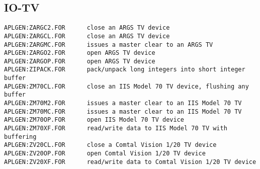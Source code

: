 \subsection{IO-TV}
\begin{verbatim}
APLGEN:ZARGC2.FOR      close an ARGS TV device
APLGEN:ZARGCL.FOR      close an ARGS TV device
APLGEN:ZARGMC.FOR      issues a master clear to an ARGS TV
APLGEN:ZARGO2.FOR      open ARGS TV device
APLGEN:ZARGOP.FOR      open ARGS TV device
APLGEN:ZIPACK.FOR      pack/unpack long integers into short integer buffer
APLGEN:ZM70CL.FOR      close an IIS Model 70 TV device, flushing any buffer
APLGEN:ZM70M2.FOR      issues a master clear to an IIS Model 70 TV
APLGEN:ZM70MC.FOR      issues a master clear to an IIS Model 70 TV
APLGEN:ZM70OP.FOR      open IIS Model 70 TV device
APLGEN:ZM70XF.FOR      read/write data to IIS Model 70 TV with buffering
APLGEN:ZV20CL.FOR      close a Comtal Vision 1/20 TV device
APLGEN:ZV20OP.FOR      open Comtal Vision 1/20 TV device
APLGEN:ZV20XF.FOR      read/write data to Comtal Vision 1/20 TV device
\end{verbatim}
 
